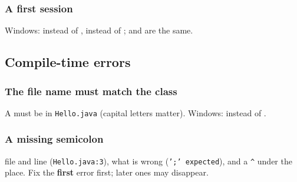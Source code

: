 \documentclass[aspectratio=169,10pt,compress]{beamer}
\begin{document}
\begin{frame}[t,fragile] \frametitle{A first session}

  \vspace{0.2em}
  \small Windows:  instead of ,  instead of ;  and  are the same.
\end{frame}


\subsection[Compile]{Compile-time errors}




\begin{frame}[t,fragile] \frametitle{The file name must match the class}

  \vspace{0.2em}
  \small A  must be in \texttt{Hello.java} (capital letters matter). Windows:  instead of .
\end{frame}




\begin{frame}[t,fragile] \frametitle{A missing semicolon}

  \vspace{0.2em}
  \small {} file and line (\texttt{Hello.java:3}), 
  what is wrong (\texttt{';' expected}),
  and a \texttt{\textasciicircum} under the place. 
  Fix the \textbf{first} error first; later ones may disappear.
\end{frame}
\end{document}
